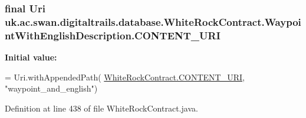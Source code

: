 \hypertarget{classuk_1_1ac_1_1swan_1_1digitaltrails_1_1database_1_1_white_rock_contract_1_1_waypoint_with_english_description_a3616ae0f5d9b135152da97580a7bc850}{
\subsubsection[{C\+O\+N\+T\+E\+N\+T\+\_\+\+U\+R\+I}]{\setlength{\rightskip}{0pt plus 5cm}final Uri uk.\+ac.\+swan.\+digitaltrails.\+database.\+White\+Rock\+Contract.\+Waypoint\+With\+English\+Description.\+C\+O\+N\+T\+E\+N\+T\+\_\+\+U\+R\+I\hspace{0.3cm}{\ttfamily [static]}}}\label{classuk_1_1ac_1_1swan_1_1digitaltrails_1_1database_1_1_white_rock_contract_1_1_waypoint_with_english_description_a3616ae0f5d9b135152da97580a7bc850}
{\bfseries Initial value\+:}
\begin{DoxyCode}
= Uri.withAppendedPath(
                \hyperlink{classuk_1_1ac_1_1swan_1_1digitaltrails_1_1database_1_1_white_rock_contract_abfe96759bfe16773a98099536eef2306}{WhiteRockContract.CONTENT\_URI}, \textcolor{stringliteral}{"waypoint\_and\_english"})
\end{DoxyCode}


Definition at line 438 of file White\+Rock\+Contract.\+java.

